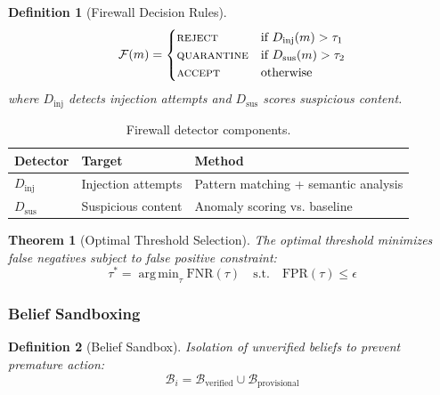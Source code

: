 \documentclass[
]{article}
\newtheorem{definition}{Definition}[section]
\newtheorem{theorem}{Theorem}[section]
\DeclareMathOperator*{\argmin}{arg\,min}
\begin{document}
\begin{definition}[Firewall Decision Rules]
\label{def:firewall-rules}
\begin{equation}
\label{eq:firewall-rules}
\mathcal{F}(m) = \begin{cases}
\textsc{reject} & \text{if } D_{\text{inj}}(m) > \tau_1 \\
\textsc{quarantine} & \text{if } D_{\text{sus}}(m) > \tau_2 \\
\textsc{accept} & \text{otherwise}
\end{cases}
\end{equation}
where $D_{\text{inj}}$ detects injection attempts and $D_{\text{sus}}$ scores suspicious content.
\end{definition}

\begin{table}[htbp]
\centering
\caption{Firewall detector components.}
\label{tab:firewall-detectors}
\begin{tabular}{@{}llp{5cm}@{}}
\toprule
Detector & Target & Method \\
\midrule
$D_{\text{inj}}$ & Injection attempts & Pattern matching + semantic analysis \\
$D_{\text{sus}}$ & Suspicious content & Anomaly scoring vs. baseline \\
\bottomrule
\end{tabular}
\end{table}

\begin{theorem}[Optimal Threshold Selection]
\label{thm:threshold-selection}
The optimal threshold minimizes false negatives subject to false positive constraint:
\begin{equation}
\label{eq:threshold-opt}
\tau^* = \argmin_\tau \text{FNR}(\tau) \quad \text{s.t.} \quad \text{FPR}(\tau) \leq \epsilon
\end{equation}
\end{theorem}

\subsubsection{Belief Sandboxing}\label{belief-sandboxing}

\begin{definition}[Belief Sandbox]
\label{def:belief-sandbox}
Isolation of unverified beliefs to prevent premature action:
\begin{equation}
\label{eq:sandbox-partition-defense}
\mathcal{B}_i = \mathcal{B}_{\text{verified}} \cup \mathcal{B}_{\text{provisional}}
\end{equation}
\end{definition}
\end{document}
